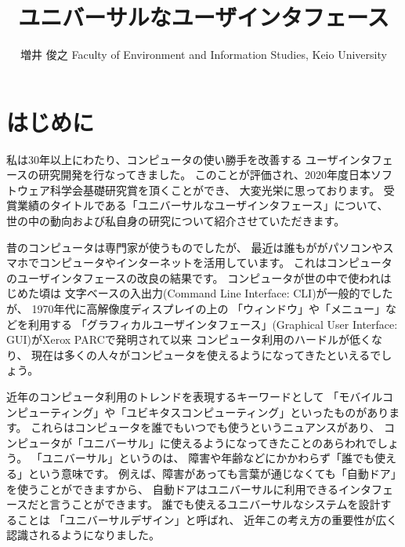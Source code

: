 \documentclass[topics]{compsoft} %
\begin{document}
\title{ユニバーサルなユーザインタフェース}

%
\author{増井 俊之
%
%
%
%
%
{Faculty of Environment and Information Studies, Keio University}
%
\shutten
%
%
}

%

\maketitle

\section{はじめに}

私は30年以上にわたり、コンピュータの使い勝手を改善する
ユーザインタフェースの研究開発を行なってきました。
このことが評価され、2020年度日本ソフトウェア科学会基礎研究賞を頂くことができ、
大変光栄に思っております。
受賞業績のタイトルである「ユニバーサルなユーザインタフェース」について、
世の中の動向および私自身の研究について紹介させていただきます。

昔のコンピュータは専門家が使うものでしたが、
最近は誰もががパソコンやスマホでコンピュータやインターネットを活用しています。
これはコンピュータのユーザインタフェースの改良の結果です。
コンピュータが世の中で使われはじめた頃は
文字ベースの入出力(Command Line Interface: CLI)が一般的でしたが、
1970年代に高解像度ディスプレイの上の
「ウィンドウ」や「メニュー」などを利用する
「グラフィカルユーザインタフェース」(Graphical User Interface: GUI)がXerox PARCで発明されて以来
コンピュータ利用のハードルが低くなり、
現在は多くの人々がコンピュータを使えるようになってきたといえるでしょう。

近年のコンピュータ利用のトレンドを表現するキーワードとして
「モバイルコンピューティング」や「ユビキタスコンピューティング」といったものがあります。
これらはコンピュータを誰でもいつでも使うというニュアンスがあり、
コンピュータが「ユニバーサル」に使えるようになってきたことのあらわれでしょう。
%
「ユニバーサル」というのは、
障害や年齢などにかかわらず「誰でも使える」という意味です。
例えば、障害があっても言葉が通じなくても「自動ドア」を使うことができますから、
自動ドアはユニバーサルに利用できるインタフェースだと言うことができます。
%
誰でも使えるユニバーサルなシステムを設計することは
「ユニバーサルデザイン」と呼ばれ、
近年この考え方の重要性が広く認識されるようになりました。
\end{document}
